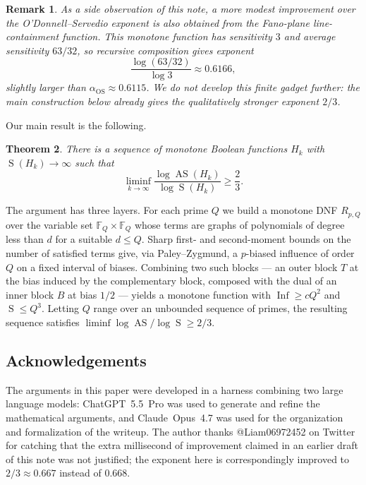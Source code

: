 \documentclass[11pt]{article}
\newtheorem{theorem}{Theorem}
\newtheorem{remark}[theorem]{Remark}
\newcommand{\F}{\mathbb F}
\newcommand{\Inf}{\operatorname{Inf}}
\newcommand{\AS}{\operatorname{AS}}
\newcommand{\sens}{\operatorname{S}}
\begin{document}
\begin{remark}
As a side observation of this note, a more modest improvement over the O'Donnell--Servedio exponent is also obtained from the Fano-plane line-containment function. This monotone function has sensitivity \(3\) and average sensitivity \(63/32\), so recursive composition gives exponent
\[
    \frac{\log(63/32)}{\log 3}\approx 0.6166,
\]
slightly larger than \(\alpha_{\mathrm{OS}}\approx 0.6115\). We do not develop this finite gadget further: the main construction below already gives the qualitatively stronger exponent \(2/3\).
\end{remark}

Our main result is the following.

\begin{theorem}\label{thm:main}
There is a sequence of monotone Boolean functions \(H_k\) with \(\sens(H_k)\to\infty\) such that
\[
    \liminf_{k\to\infty}\frac{\log\AS(H_k)}{\log\sens(H_k)}\ge \frac{2}{3}.
\]
\end{theorem}

The argument has three layers. For each prime \(Q\) we build a monotone DNF \(R_{p,Q}\) over the variable set \(\F_Q\times\F_Q\) whose terms are graphs of polynomials of degree less than \(d\) for a suitable \(d\le Q\). Sharp first- and second-moment bounds on the number of satisfied terms give, via Paley--Zygmund, a \(p\)-biased influence of order \(Q\) on a fixed interval of biases. Combining two such blocks --- an outer block \(T\) at the bias induced by the complementary block, composed with the dual of an inner block \(B\) at bias \(1/2\) --- yields a monotone function with \(\Inf\ge cQ^2\) and \(\sens\le Q^3\). Letting \(Q\) range over an unbounded sequence of primes, the resulting sequence satisfies \(\liminf\log\AS/\log\sens\ge 2/3\).

\subsection*{Acknowledgements}
The arguments in this paper were developed in a harness combining two large language models: ChatGPT~5.5~Pro was used to generate and refine the mathematical arguments, and Claude~Opus~4.7 was used for the organization and formalization of the writeup. The author thanks @Liam06972452 on Twitter for catching that the extra millisecond of improvement claimed in an earlier draft of this note was not justified; the exponent here is correspondingly improved to \(2/3\approx 0.667\) instead of \(0.668\).
\end{document}
